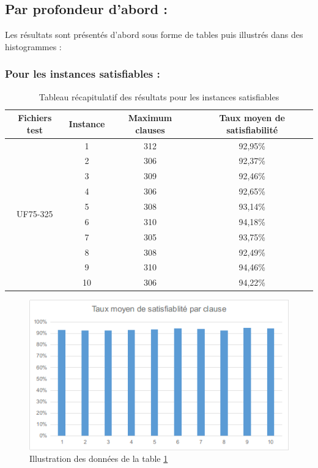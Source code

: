 \newpage
\subsection{Par profondeur d'abord :}
Les résultats sont présentés d'abord sous forme de tables puis illustrés dans des histogrammes : 
\subsubsection{Pour les instances satisfiables :}
\begin{table}[H]
	\centering
	\begin{tabular}{|c|c|c|c|}
	\hline
	Fichiers test              & Instance & Maximum clauses & Taux moyen de satisfiabilité \\ \hline
	\multirow{10}{*}{UF75-325} & 1        & 312             & 92,95\%                      \\ \cline{2-4} 
	& 2        & 306             & 92,37\%                      \\ \cline{2-4} 
	& 3        & 309             & 92,46\%                      \\ \cline{2-4} 
	& 4        & 306             & 92,65\%                      \\ \cline{2-4} 
	& 5        & 308             & 93,14\%                      \\ \cline{2-4} 
	& 6        & 310             & 94,18\%                      \\ \cline{2-4} 
	& 7        & 305             & 93,75\%                      \\ \cline{2-4} 
	& 8        & 308             & 92,49\%                      \\ \cline{2-4} 
	& 9        & 310             & 94,46\%                      \\ \cline{2-4} 
	& 10       & 306             & 94,22\%                      \\ \hline
\end{tabular}
	\caption{Tableau récapitulatif des résultats pour les instances satisfiables}
	\label{table:Tab_DFS_Sat}
\end{table}
\begin{figure}[H]
	\includegraphics[width=\textwidth]{images/DFSUF75Graph.png}
	\caption{Illustration des données de la table \ref{table:Tab_DFS_Sat}}
\end{figure}



